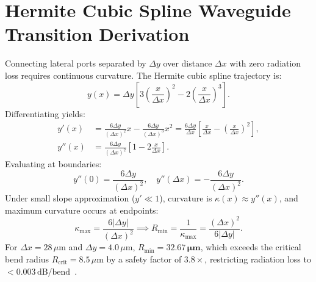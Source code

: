 \documentclass[journal]{IEEEtran}
\begin{document}
\section{Hermite Cubic Spline Waveguide Transition Derivation}
Connecting lateral ports separated by $\Delta y$ over distance $\Delta x$ with zero radiation loss requires continuous curvature. The Hermite cubic spline trajectory is:
\begin{equation}
    y(x) = \Delta y \left[ 3 \left(\frac{x}{\Delta x}\right)^2 - 2 \left(\frac{x}{\Delta x}\right)^3 \right].
\end{equation}
Differentiating yields:
\begin{align}
    y'(x) &= \frac{6 \Delta y}{(\Delta x)^2} x - \frac{6 \Delta y}{(\Delta x)^3} x^2 = \frac{6 \Delta y}{\Delta x} \left[ \frac{x}{\Delta x} - \left(\frac{x}{\Delta x}\right)^2 \right], \\
    y''(x) &= \frac{6 \Delta y}{(\Delta x)^2} \left[ 1 - 2 \frac{x}{\Delta x} \right].
\end{align}
Evaluating at boundaries:
\begin{equation}
    y''(0) = \frac{6 \Delta y}{(\Delta x)^2}, \quad y''(\Delta x) = -\frac{6 \Delta y}{(\Delta x)^2}.
\end{equation}
Under small slope approximation ($y' \ll 1$), curvature is $\kappa(x) \approx y''(x)$, and maximum curvature occurs at endpoints:
\begin{equation}
    \kappa_{\max} = \frac{6 |\Delta y|}{(\Delta x)^2} \implies R_{\min} = \frac{1}{\kappa_{\max}} = \frac{(\Delta x)^2}{6 |\Delta y|}.
\end{equation}
For $\Delta x = 28\,\mu\text{m}$ and $\Delta y = 4.0\,\mu\text{m}$, $R_{\min} = \mathbf{32.67\,\mu\text{m}}$, which exceeds the critical bend radius $R_{\text{crit}} = 8.5\,\mu\text{m}$ by a safety factor of $3.8\times$, restricting radiation loss to $< 0.003\,\text{dB/bend}$~\cite{omi_sim_report}.
\end{document}
